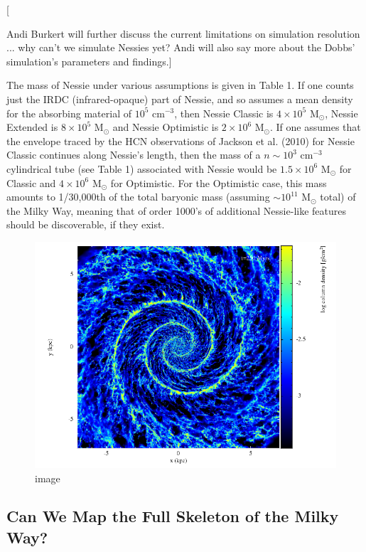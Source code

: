 \documentclass[]{article}
\makeatletter
\def\maxwidth{\ifdim\Gin@nat@width>\linewidth\linewidth
\else\Gin@nat@width\fi}
\let\Oldincludegraphics\includegraphics
\renewcommand{\includegraphics}[1]{\Oldincludegraphics[width=\maxwidth]{#1}}
\makeatother
\begin{document}
{[}

Andi Burkert will further discuss the current limitations on simulation
resolution ... why can't we simulate Nessies yet? Andi will also say
more about the Dobbs' simulation's parameters and findings.{]}

The mass of Nessie under various assumptions is given in Table 1. If one
counts just the IRDC (infrared-opaque) part of Nessie, and so assumes a
mean density for the absorbing material of $10^5$ cm$^{-3}$, then Nessie
Classic is $4 \times 10^5$ M$_\odot$, Nessie Extended is $8 \times 10^5$
M$_\odot$ and Nessie Optimistic is $2 \times 10^6$ M$_\odot$. If one
assumes that the envelope traced by the HCN observations of Jackson et
al. (2010) for Nessie Classic continues along Nessie's length, then the
mass of a $n\sim 10^3$ cm$^{-3}$ cylindrical tube (see Table 1)
associated with Nessie would be $1.5 \times 10^6$ M$_\odot$ for Classic
and $4 \times 10^6$ M$_\odot$ for Optimistic. For the Optimistic case,
this mass amounts to 1/30,000th of the total baryonic mass (assuming
$\sim 10^{11}$ M$_\odot$ total) of the Milky Way, meaning that of order
1000's of additional Nessie-like features should be discoverable, if
they exist.

\begin{figure}[htbp]
\centering
\includegraphics{figures/bones_dobbs/bones_dobbs.png}
\caption{image}
\end{figure}

\subsection{Can We Map the Full Skeleton of the Milky Way?}
\end{document}
